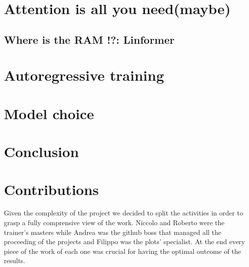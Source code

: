 \documentclass[conference,compsoc,11pt]{IEEEtran}
\begin{document}
\section{Attention is all you need(maybe)}\label{sec:features-extractor}



\subsection{Where is the RAM !?: Linformer}


\section{Autoregressive training}\label{sec: tuning}



\section{Model choice}\label{sec:model-choice}
 


\section{Conclusion}



\section{Contributions}
Given the complexity of the project we decided to split the activities in order to grasp a fully comprensive view of the work. Niccolo and Roberto were the trainer's masters while Andrea was the github boss that managed all the proceeding of the projects and Filippo was the plots' specialist. At the end every piece of the work of each one was crucial for having the optimal outcome of the results.
\end{document}
